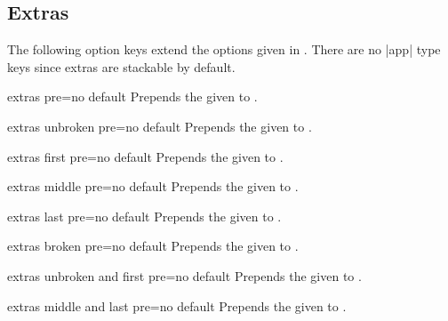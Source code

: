 \clearpage
\subsection{Extras}
The following option keys extend the options given in .
There are no |app| type keys since extras are stackable by default.

\begin{docTcbKey}[][doc new=2015-07-16]{extras pre}{=}{no default}
  Prepends the given  to .
\end{docTcbKey}

\begin{docTcbKey}[][doc new=2015-07-16]{extras unbroken pre}{=}{no default}
  Prepends the given  to .
\end{docTcbKey}

\begin{docTcbKey}[][doc new=2015-07-16]{extras first pre}{=}{no default}
  Prepends the given  to .
\end{docTcbKey}

\begin{docTcbKey}[][doc new=2015-07-16]{extras middle pre}{=}{no default}
  Prepends the given  to .
\end{docTcbKey}

\begin{docTcbKey}[][doc new=2015-07-16]{extras last pre}{=}{no default}
  Prepends the given  to .
\end{docTcbKey}

\begin{docTcbKey}[][doc new=2015-07-16]{extras broken pre}{=}{no default}
  Prepends the given  to .
\end{docTcbKey}

\begin{docTcbKey}[][doc new=2015-07-16]{extras unbroken and first pre}{=}{no default}
  Prepends the given  to .
\end{docTcbKey}

\begin{docTcbKey}[][doc new=2015-07-16]{extras middle and last pre}{=}{no default}
  Prepends the given  to .
\end{docTcbKey}

